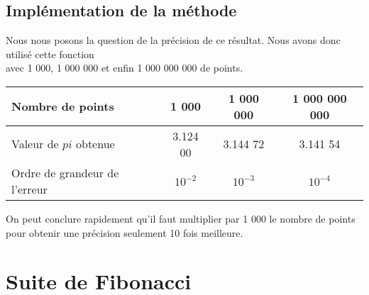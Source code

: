 \documentclass[a4paper]{article}
\begin{document}
\subsection{Implémentation de la méthode}
\begin{mdframed}[backgroundcolor=light-gray, roundcorner=20pt,
	leftmargin=-45, rightmargin=-45, 
	innerleftmargin=20, innertopmargin=1, innerbottommargin=1, 
	outerlinewidth=1, linecolor=darkgray]
	
\end{mdframed}

Nous nous posons la question de la précision de ce résultat. Nous avons donc utilisé cette fonction\\ avec 1 000, 1 000 000 et enfin 1 000 000 000 de points.
\smallskip
\begin{center}
	\begin{tabular}{|l||c|c|c|}
		\hline
		Nombre de points & 1 000 & 1 000 000 & 1 000 000 000
		\\\hline
		Valeur de $pi$ obtenue & 3.124 00 & 3.144 72 & 3.141 54
		\\\hline
		Ordre de grandeur de l'erreur & $10^{-2}$ & $10^{-3}$ & $10^{-4}$
		\\\hline
	\end{tabular}
\end{center}

On peut conclure rapidement qu'il faut multiplier par 1 000 le nombre de points pour obtenir une précision seulement 10 fois meilleure.
\section{Suite de Fibonacci}
\end{document}
